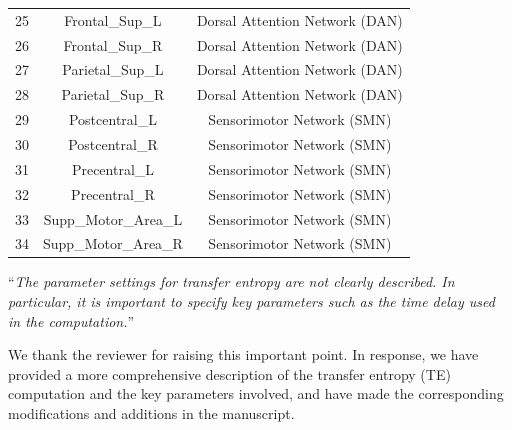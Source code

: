 \documentclass[12pt,technote,onecolumn]{IEEEtran}
\begin{document}
\begin{table}[htbp]
\begin{tabular}{ccc}
25 & Frontal\_Sup\_L       & Dorsal Attention Network (DAN) \\
26 & Frontal\_Sup\_R       & Dorsal Attention Network (DAN) \\
27 & Parietal\_Sup\_L      & Dorsal Attention Network (DAN) \\
28 & Parietal\_Sup\_R      & Dorsal Attention Network (DAN) \\
29 & Postcentral\_L        & Sensorimotor Network (SMN) \\
30 & Postcentral\_R        & Sensorimotor Network (SMN) \\
31 & Precentral\_L         & Sensorimotor Network (SMN) \\
32 & Precentral\_R         & Sensorimotor Network (SMN) \\
33 & Supp\_Motor\_Area\_L  & Sensorimotor Network (SMN) \\
34 & Supp\_Motor\_Area\_R  & Sensorimotor Network (SMN) \\
\bottomrule
\end{tabular}
\end{table}

\newpage

\vspace{4mm}

 ``{\it The parameter settings for transfer entropy are not clearly described. In particular, it is important to specify key parameters such as the time delay used in the computation.}''
\vspace{1mm}


We thank the reviewer for raising this important point. In response, we have provided a more comprehensive description of the transfer entropy (TE) computation and the key parameters involved, and have made the corresponding modifications and additions in the manuscript.
\end{document}
